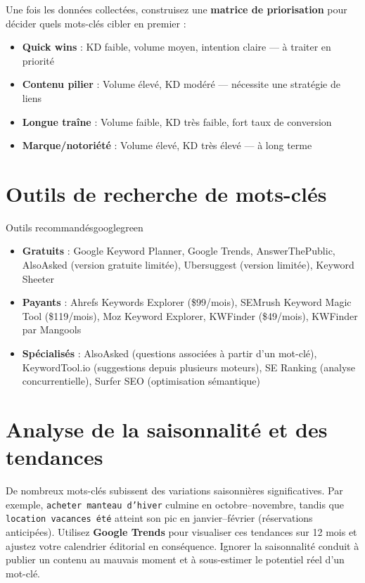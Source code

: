 \documentclass[12pt,a4paper,twoside]{report}
\newcommand{\keyword}[1]{\textbf{\textcolor{googleblue}{#1}}}
\begin{document}
Une fois les données collectées, construisez une \keyword{matrice de priorisation} pour décider quels mots-clés cibler en premier :

\begin{itemize}
    \item \textbf{Quick wins} : KD faible, volume moyen, intention claire --- à traiter en priorité
    \item \textbf{Contenu pilier} : Volume élevé, KD modéré --- nécessite une stratégie de liens
    \item \textbf{Longue traîne} : Volume faible, KD très faible, fort taux de conversion
    \item \textbf{Marque/notoriété} : Volume élevé, KD très élevé --- à long terme
\end{itemize}

\section{Outils de recherche de mots-clés}

\begin{mybox}{Outils recommandés}{googlegreen}
\begin{itemize}
    \item \textbf{Gratuits} : Google Keyword Planner, Google Trends, AnswerThePublic, AlsoAsked (version gratuite limitée), Ubersuggest (version limitée), Keyword Sheeter
    \item \textbf{Payants} : Ahrefs Keywords Explorer (\$99/mois), SEMrush Keyword Magic Tool (\$119/mois), Moz Keyword Explorer, KWFinder (\$49/mois), KWFinder par Mangools
    \item \textbf{Spécialisés} : AlsoAsked (questions associées à partir d'un mot-clé), KeywordTool.io (suggestions depuis plusieurs moteurs), SE Ranking (analyse concurrentielle), Surfer SEO (optimisation sémantique)
\end{itemize}
\end{mybox}

\section{Analyse de la saisonnalité et des tendances}

De nombreux mots-clés subissent des variations saisonnières significatives. Par exemple, \texttt{acheter manteau d'hiver} culmine en octobre--novembre, tandis que \texttt{location vacances été} atteint son pic en janvier--février (réservations anticipées). Utilisez \keyword{Google Trends} pour visualiser ces tendances sur 12 mois et ajustez votre calendrier éditorial en conséquence. Ignorer la saisonnalité conduit à publier un contenu au mauvais moment et à sous-estimer le potentiel réel d'un mot-clé.
\end{document}
